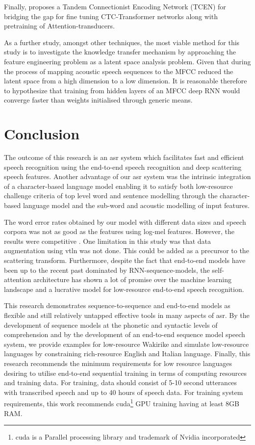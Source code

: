 Finally, \cite{wang2019bridging} proposes a Tandem Connectionist Encoding Network (TCEN) for bridging the gap for fine tuning CTC-Transformer networks along with pretraining of Attention-transducers.

As a further study, amongst other techniques, the most viable method for this study is to investigate the knowledge transfer mechanism by approaching the feature engineering problem as a latent space analysis problem.  Given that during the process of mapping acoustic speech sequences to the MFCC reduced the latent space from a high dimension to a low dimension.  It is reasonable therefore to hypothesize that training from hidden layers of an MFCC deep RNN would converge faster than weights initialised through generic means.

\startblue
\section{Conclusion}

The outcome of this research is an \acrshort{asr} system which facilitates fast and efficient speech recognition using the end-to-end speech recognition and deep scattering speech features.  Another advantage of our \acrshort{asr} system was the intrinsic integration of a character-based language model enabling it to satisfy both low-resource challenge criteria of top level word and sentence modelling through the character-based language model and the sub-word and acoustic modelling of input features.

The word error rates obtained by our model with different data sizes and speech corpora was not as good as the features using log-mel features. However, the results were competitive . One limitation in this study was that data augmentation using \acrlong{vtln} was not done. This could be added as a precursor to the scattering transform.  Furthermore, despite the fact that end-to-end models have been up to the recent past dominated by RNN-sequence-models, the self-attention \citep{vaswani2017attention} architecture has shown a lot of promise over the machine learning landscape and a lucrative model for low-resource end-to-end speech recognition. 

This research demonstrates sequence-to-sequence and end-to-end models as flexible and still relatively untapped effective tools in many aspects of \acrshort{asr}.  By the development of sequence models at the phonetic and syntactic levels of comprehension and by the development of an end-to-end sequence model speech system, we provide examples for low-resource Wakirike and simulate low-resource languages by constraining rich-resource English and Italian language.   Finally, this research recommends the minimum requirements for low resource languages desiring to utilise end-to-end sequential training in terms of computing resources and training data.  For training, data should consist of 5-10 second utterances with transcribed speech and up to 40 hours of speech data.  For training system requirements, this work recommends \acrshort{cuda}\footnote{\acrfull{cuda} is a Parallel processing library and trademark of Nvidia incorporated} GPU training having at least 8GB RAM.
 
\stopblue



